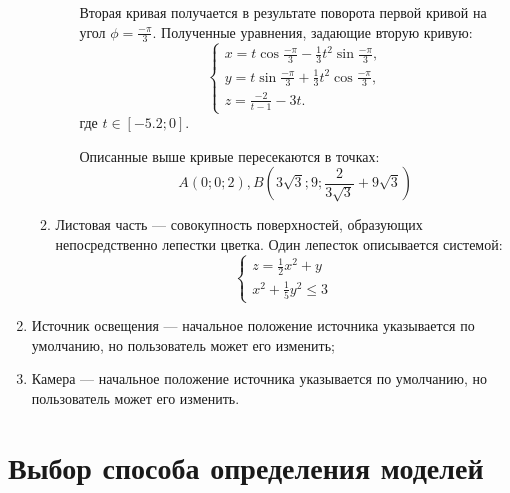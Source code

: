 \begin{enumerate}
\begin{enumerate}[label*=\arabic*.]
\begin{enumerate}[label=\alph*)]
			Вторая кривая получается в результате поворота первой кривой на угол $\phi = \frac{-\pi}{3}$. Полученные уравнения, задающие вторую кривую:
			\begin{equation*}
				\begin{cases}
					x = t\cos\frac{-\pi}{3}-\frac{1}{3}t^2\sin\frac{-\pi}{3},\\
					y = t\sin\frac{-\pi}{3}+\frac{1}{3}t^2\cos\frac{-\pi}{3},\\
					z = \frac{-2}{t-1}-3t.
				\end{cases}
			\end{equation*}
			где $t \in [-5.2;0]$.
			
			Описанные выше кривые пересекаются в точках:
			$$ A(0;0;2), B(3\sqrt{3}; 9; \frac{2}{3\sqrt{3}} +9\sqrt{3}) $$
			
		\end{enumerate}
		\item Листовая часть --- совокупность поверхностей, образующих непосредственно лепестки цветка. Один лепесток описывается системой:
		\begin{equation*}
		\begin{cases}
			z = \frac{1}{2}x^2+y\\
			x^2+\frac{1}{5}y^2 \leq 3
		\end{cases}
		\end{equation*}
	\end{enumerate}
	\item Источник освещения --- начальное положение источника указывается по умолчанию, но пользователь может его изменить;
	\item Камера --- начальное положение источника указывается по умолчанию, но пользователь может его изменить.
\end{enumerate}

\section{Выбор способа определения моделей}

